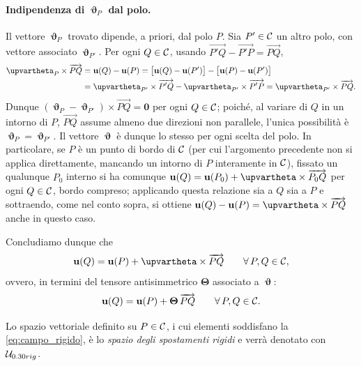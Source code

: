 \paragraph{Indipendenza di $\bm\upvartheta_P$ dal polo.}
Il vettore $\bm\upvartheta_P$ trovato dipende, a priori, dal polo $P$. Sia $P'\in\mathcal{C}$ un altro polo, con vettore associato $\bm\upvartheta_{P'}$. Per ogni $Q\in\mathcal{C}$, usando $\overrightarrow{P'Q}-\overrightarrow{P'P}=\overrightarrow{PQ}$,
\begin{equation}
	\begin{aligned}
		\bm\upvartheta_P\times\overrightarrow{PQ} &= \ub(Q)-\ub(P)
		= \bigl[\ub(Q)-\ub(P')\bigr]-\bigl[\ub(P)-\ub(P')\bigr]\\
		&= \bm\upvartheta_{P'}\times\overrightarrow{P'Q}-\bm\upvartheta_{P'}\times\overrightarrow{P'P}
		= \bm\upvartheta_{P'}\times\overrightarrow{PQ}.
	\end{aligned}
\end{equation}
Dunque $(\bm\upvartheta_P-\bm\upvartheta_{P'})\times\overrightarrow{PQ}=\mathbf 0$ per ogni $Q\in\mathcal{C}$; poiché, al variare di $Q$ in un intorno di $P$, $\overrightarrow{PQ}$ assume almeno due direzioni non parallele, l'unica possibilità è $\bm\upvartheta_P=\bm\upvartheta_{P'}$. Il vettore $\bm\upvartheta$ è dunque lo stesso per ogni scelta del polo. In particolare, se $P$ è un punto di bordo di $\mathcal{C}$ (per cui l'argomento precedente non si applica direttamente, mancando un intorno di $P$ interamente in $\mathcal{C}$), fissato un qualunque $P_0$ interno si ha comunque $\ub(Q)=\ub(P_0)+\bm\upvartheta\times\overrightarrow{P_0Q}$ per ogni $Q\in\mathcal{C}$, bordo compreso; applicando questa relazione sia a $Q$ sia a $P$ e sottraendo, come nel conto sopra, si ottiene $\ub(Q)-\ub(P)=\bm\upvartheta\times\overrightarrow{PQ}$ anche in questo caso.

Concludiamo dunque che 
\begin{equation}\label{eq:campo_rigido}
	\ub(Q) = \ub(P) + \bm{\upvartheta}\times \overrightarrow{PQ} \qquad \forall\, P,Q \in \Cc,
\end{equation}
ovvero, in termini del tensore antisimmetrico $\bm{\Theta}$ associato a $\bm\upvartheta$:
\begin{equation}\label{eq:campo_rigidoTH}
	\mathbf{u}(Q) = \mathbf{u}(P) + \bm{\Theta}\, \overrightarrow{PQ} \qquad \forall\, P,Q \in \mathcal{C}.
\end{equation}

Lo spazio vettoriale definito su $P\in\mathcal{C}$, i cui elementi  soddisfano la \eqref{eq:campo_rigido}, è lo
\textit{spazio degli spostamenti rigidi} e verrà denotato con $\mathcal{U}_{0.30 rig}$.




